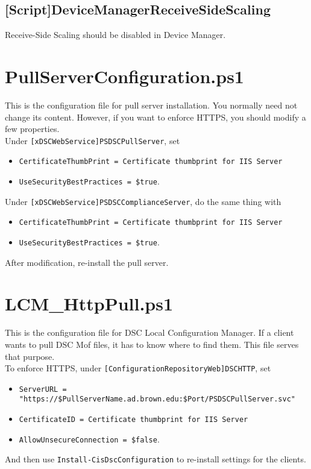     \subsection{[Script]DeviceManagerReceiveSideScaling}
      Receive-Side Scaling should be disabled in Device Manager.

  \section{PullServerConfiguration.ps1}
    This is the configuration file for pull server installation. You normally need not change its content. However, if you want to enforce HTTPS, you should modify a few properties.\\
    Under \verb^[xDSCWebService]PSDSCPullServer^, set
    \begin{itemize}
      \item \verb^CertificateThumbPrint = Certificate thumbprint for IIS Server^
      \item \verb^UseSecurityBestPractices = $true^.
    \end{itemize}
    Under \verb^[xDSCWebService]PSDSCComplianceServer^, do the same thing with
    \begin{itemize}
      \item \verb^CertificateThumbPrint = Certificate thumbprint for IIS Server^
      \item \verb^UseSecurityBestPractices = $true^.
    \end{itemize}
    After modification, re-install the pull server.

  \section{LCM\_HttpPull.ps1}
    This is the configuration file for DSC Local Configuration Manager. If a client wants to pull DSC Mof files, it has to know where to find them. This file serves that purpose.\\
    To enforce HTTPS, under \verb^[ConfigurationRepositoryWeb]DSCHTTP^, set
    \begin{itemize}
      \item \verb^ServerURL =^\\
      \verb^"https://$PullServerName.ad.brown.edu:$Port/PSDSCPullServer.svc"^
      \item \verb^CertificateID = Certificate thumbprint for IIS Server^
      \item \verb^AllowUnsecureConnection = $false^.
    \end{itemize}
    And then use \verb^Install-CisDscConfiguration^ to re-install settings for the clients.
